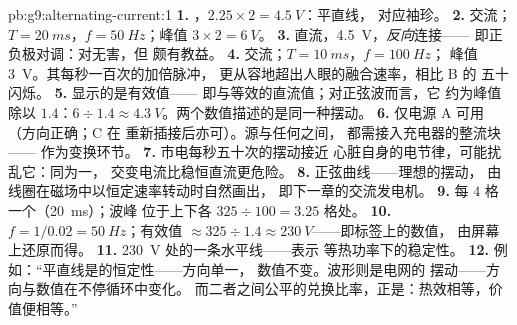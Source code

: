 \begin{solution}{pb:g9:alternating-current:1}
\textbf{1.} ，$2.25 \times 2 = \qty{4.5}{V}$：平直线，
对应袖珍。
\textbf{2.} 交流；$T = \qty{20}{ms}$，$f = \qty{50}{Hz}$；峰值
$3 \times 2 = \qty{6}{V}$。
\textbf{3.} 直流，\qty{4.5}{V}，\emph{反向}连接——
即正负极对调：对无害，但
颇有教益。
\textbf{4.} 交流；$T = \qty{10}{ms}$，$f = \qty{100}{Hz}$；
峰值 \qty{3}{V}。其每秒一百次的加倍脉冲，
更从容地超出人眼的融合速率，相比 B 的
五十闪烁。
\textbf{5.} 显示的是有效值——
即与等效的直流值；对正弦波而言，它
约为峰值除以 $1.4$：$6 \div 1.4 \approx
\qty{4.3}{V}$。两个数值描述的是同一种摆动。
\textbf{6.} 仅电源 A 可用（方向正确；C 在
重新插接后亦可）。源与任何之间，
都需接入充电器的整流块——
作为变换环节。
\textbf{7.} 市电每秒五十次的摆动接近
心脏自身的电节律，可能扰乱它：同为一，
交变电流比稳恒直流更危险。
\textbf{8.} 正弦曲线——理想的摆动，
由线圈在磁场中以恒定速率转动时自然画出，
即下一章的交流发电机。
\textbf{9.} 每 $4$ 格一个（\qty{20}{ms}）；波峰
位于上下各 $325 \div 100 = 3.25$ 格处。
\textbf{10.} $f = 1/0.02 = \qty{50}{Hz}$；有效值 $\approx
325 \div 1.4 \approx \qty{230}{V}$——即标签上的数值，
由屏幕上还原而得。
\textbf{11.} \qty{230}{V} 处的一条水平线——表示
等热功率下的稳定性。
\textbf{12.} 例如：“平直线是的恒定性——方向单一，
数值不变。波形则是电网的
摆动——方向与数值在不停循环中变化。
而二者之间公平的兑换比率，正是：热效相等，价值便相等。”
\end{solution}
